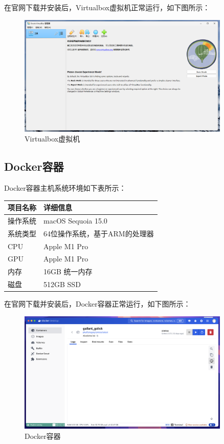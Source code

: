 \documentclass{article}
\begin{document}
在官网下载并安装后，Virtualbox虚拟机正常运行，如下图所示：

\begin{figure}[H]
  \centering
  \includegraphics[width=0.9\textwidth]{img/virtual_install.png}
  \caption{Virtualbox虚拟机}
\end{figure}

\subsection{Docker容器}

Docker容器主机系统环境如下表所示：

\begin{center}
	\begin{tabular}{| >{\centering\arraybackslash}m{3cm} | >{\centering\arraybackslash}m{7cm} |}    
		\hline  
		\textbf{项目名称} & \textbf{详细信息} \\
		\hline  
		操作系统 & macOS Sequoia 15.0 \\  
		\hline  
		系统类型 & 64位操作系统，基于ARM的处理器 \\  
		\hline
		CPU & Apple M1 Pro \\  
		\hline 
		GPU & Apple M1 Pro\\  
		\hline 
		内存 & 16GB 统一内存 \\  
		\hline 
		磁盘 & 512GB SSD \\  
		\hline 		
	\end{tabular}
\end{center}

在官网下载并安装后，Docker容器正常运行，如下图所示：

\begin{figure}[H]
	\centering
	\includegraphics[width=0.9\textwidth]{img/docker_install.png}
	\caption{Docker容器}
\end{figure}
\end{document}
